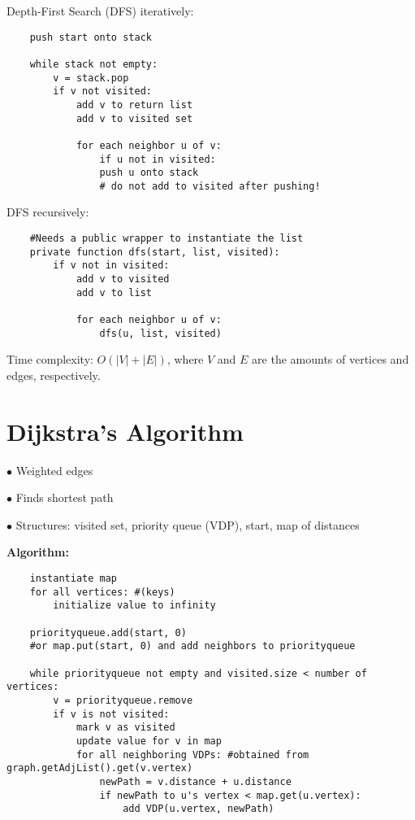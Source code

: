 \documentclass[english,openany]{book}
\begin{document}
    Depth-First Search (DFS) iteratively:

    \begin{lstlisting}
    push start onto stack

    while stack not empty:
        v = stack.pop
        if v not visited:
            add v to return list
            add v to visited set

            for each neighbor u of v:
                if u not in visited:
                push u onto stack
                # do not add to visited after pushing!
    \end{lstlisting}

    DFS recursively:

    \begin{lstlisting}
    #Needs a public wrapper to instantiate the list
    private function dfs(start, list, visited):
        if v not in visited:
            add v to visited
            add v to list

            for each neighbor u of v:
                dfs(u, list, visited)
    \end{lstlisting}

    Time complexity: $O(|V| + |E|)$, where $V$ and $E$ are the amounts of vertices and edges, respectively.
    \newpage

    \section{Dijkstra's Algorithm}

    $\bullet$ Weighted edges

    $\bullet$ Finds shortest path

    $\bullet$ Structures: visited set, priority queue (VDP), start, map of distances

    \textbf{Algorithm:}

    \begin{lstlisting}
    instantiate map
    for all vertices: #(keys)
        initialize value to infinity

    priorityqueue.add(start, 0)
    #or map.put(start, 0) and add neighbors to priorityqueue

    while priorityqueue not empty and visited.size < number of vertices:
        v = priorityqueue.remove
        if v is not visited:
            mark v as visited
            update value for v in map
            for all neighboring VDPs: #obtained from graph.getAdjList().get(v.vertex)
                newPath = v.distance + u.distance
                if newPath to u's vertex < map.get(u.vertex):
                    add VDP(u.vertex, newPath)

    \end{lstlisting}
\end{document}
